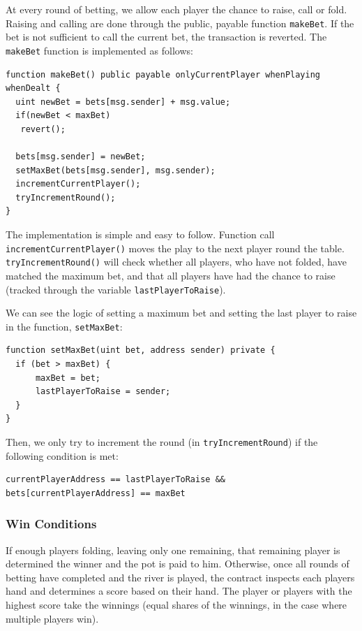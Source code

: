 At every round of betting, we allow each player the chance to raise, call or fold. Raising and calling are done through the public, payable function \texttt{makeBet}. If the bet is not sufficient to call the current bet, the transaction is reverted. The \texttt{makeBet} function is implemented as follows:

\begin{lstlisting}
function makeBet() public payable onlyCurrentPlayer whenPlaying whenDealt {
  uint newBet = bets[msg.sender] + msg.value;
  if(newBet < maxBet)
   revert();

  bets[msg.sender] = newBet;
  setMaxBet(bets[msg.sender], msg.sender);
  incrementCurrentPlayer();
  tryIncrementRound();
}
\end{lstlisting}

The implementation is simple and easy to follow. Function call \texttt{incrementCurrentPlayer()} moves the play to the next player round the table. \texttt{tryIncrementRound()} will check whether all players, who have not folded, have matched the maximum bet, and that all players have had the chance to raise (tracked through the variable \texttt{lastPlayerToRaise}).

We can see the logic of setting a maximum bet and setting the last player to raise in the function, \texttt{setMaxBet}:

\begin{lstlisting}
function setMaxBet(uint bet, address sender) private {
  if (bet > maxBet) {
      maxBet = bet;
      lastPlayerToRaise = sender;
  }
}
\end{lstlisting}

Then, we only try to increment the round (in \texttt{tryIncrementRound}) if the following condition is met:

\begin{lstlisting}
currentPlayerAddress == lastPlayerToRaise && bets[currentPlayerAddress] == maxBet
\end{lstlisting}

\subsubsection{Win Conditions}

If enough players folding, leaving only one remaining, that remaining player is determined the winner and the pot is paid to him. Otherwise, once all rounds of betting have completed and the river is played, the contract inspects each players hand and determines a score based on their hand. The player or players with the highest score take the winnings (equal shares of the winnings, in the case where multiple players win).

